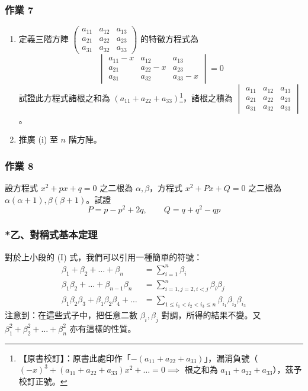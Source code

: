 \subsubsection*{作業 7}\label{hw:b6s-2-7}
\begin{enumerate}[label=(\roman*), leftmargin=2em]
  \item 定義三階方陣 $\begin{pmatrix} a_{11} & a_{12} & a_{13} \\ a_{21} & a_{22} & a_{23} \\ a_{31} & a_{32} & a_{33} \end{pmatrix}$ 的特徵方程式為
  \[ \begin{vmatrix}
  a_{11}-x & a_{12} & a_{13} \\
  a_{21} & a_{22}-x & a_{23} \\
  a_{31} & a_{32} & a_{33}-x
  \end{vmatrix} = 0 \]
  試證此方程式諸根之和為 $(a_{11}+a_{22}+a_{33})$\label{note:b6s-ch2-p95-trace}\footnote{【原書校訂】：原書此處印作「$-(a_{11}+a_{22}+a_{33})$」，漏消負號（$(-x)^3 + (a_{11}+a_{22}+a_{33})x^2 + \dots = 0 \implies$ 根之和為 $a_{11}+a_{22}+a_{33}$），茲予校訂正號。}，諸根之積為 $\begin{vmatrix} a_{11} & a_{12} & a_{13} \\ a_{21} & a_{22} & a_{23} \\ a_{31} & a_{32} & a_{33} \end{vmatrix}$。
  \item 推廣 (i) 至 $n$ 階方陣。
\end{enumerate}

\subsubsection*{作業 8}\label{hw:b6s-2-8}
設方程式 $x^2+px+q=0$ 之二根為 $\alpha, \beta$，方程式 $x^2+Px+Q=0$ 之二根為 $\alpha(\alpha+1), \beta(\beta+1)$。試證
\[ P = p - p^2 + 2q, \qquad Q = q + q^2 - qp \]

\subsubsection*{*乙、對稱式基本定理}\label{subsec:b6s-2-3-b}

對於上小段的 (I) 式，我們可以引用一種簡單的符號：
\begin{align*}
\beta_1+\beta_2+\dots+\beta_n &= \sum_{i=1}^n \beta_i \\
\beta_1\beta_2+\dots+\beta_{n-1}\beta_n &= \sum_{i=1, j=2, i<j}^n \beta_i \beta_j \\
\beta_1\beta_2\beta_3+\beta_1\beta_2\beta_4+\dots &= \sum_{1 \le i_1 < i_2 < i_3 \le n} \beta_{i_1}\beta_{i_2}\beta_{i_3}
\end{align*}
注意到：在這些式子中，把任意二數 $\beta_i, \beta_j$ 對調，所得的結果不變。又 $\beta_1^2+\beta_2^2+\dots+\beta_n^2$ 亦有這樣的性質。

